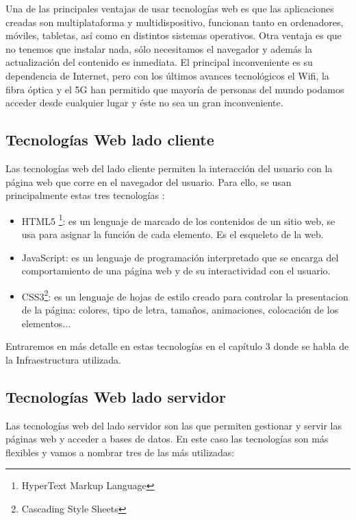 Una de las principales ventajas de usar tecnologías web es que las aplicaciones creadas son multiplataforma y multidispositivo, funcionan tanto en ordenadores, móviles, tabletas, así como en distintos sistemas operativos. Otra ventaja es que no tenemos que instalar nada, sólo necesitamos el navegador y además la actualización del contenido es inmediata. El principal inconveniente es su dependencia de Internet, pero con los últimos avances tecnológicos el Wifi, la fibra óptica y el 5G han permitido que  mayoría de personas del mundo podamos acceder desde cualquier lugar y éste no sea un gran inconveniente.


\subsection{Tecnologías Web lado cliente}
Las tecnologías web del lado cliente  permiten la interacción del usuario con la página web que corre en el navegador del usuario. Para ello, se usan principalmente estas tres tecnologías \cite{tecnologiascliente}:

\begin{itemize}
  \item HTML5 \footnote{HyperText Markup Language}: es un lenguaje de marcado de los contenidos de un sitio web, se usa para asignar la función de cada elemento. Es el esqueleto de la web.
  \item JavaScript: es un lenguaje de programación interpretado que se encarga del comportamiento de una página web y de su interactividad con el usuario.
  \item CSS3\footnote{Cascading Style Sheets}: es un lenguaje de hojas de estilo creado para controlar la presentacion de la página: colores, tipo de letra, tamaños, animaciones, colocación de los elementos...
\end{itemize}

Entraremos en más detalle en estas tecnologías en el capítulo 3 donde se habla de la Infraestructura utilizada.

\newpage
\subsection{Tecnologías Web lado servidor}
Las tecnologías web del lado servidor son las que permiten gestionar y servir las páginas web y acceder a bases de datos. En este caso las tecnologías son más flexibles y vamos a nombrar tres de las más utilizadas:

